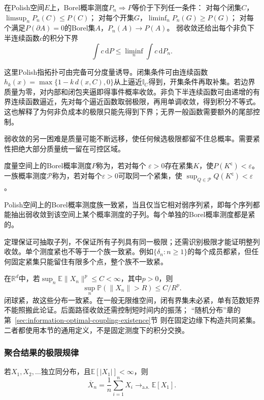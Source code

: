 \begin{theorem}[Portmanteau的常用形式]
\label{thm:rv-portmanteau}
在Polish空间\(E\)上，Borel概率测度\(P_n\Rightarrow P\)等价于下列任一条件：
对每个闭集\(C\)，\(\limsup_nP_n(C)\leq P(C)\)；
对每个开集\(G\)，\(\liminf_nP_n(G)\geq P(G)\)；
对每个满足\(P(\partial A)=0\)的Borel集\(A\)，\(P_n(A)\to P(A)\)。
弱收敛还给出每个非负下半连续函数\(c\)的积分下界
\[
\int c\,\mathrm dP\leq\liminf_n\int c\,\mathrm dP_n.
\]
\end{theorem}
这里Polish指拓扑可由完备可分度量诱导。闭集条件可由连续函数
\(h_k(x)=\max\{1-k\,d(x,C),0\}\)从上逼近\(\mathbb I_C\)得到，开集条件再取补集。若边界质量为零，对内部和闭包夹逼即得事件概率收敛。非负下半连续函数可由递增的有界连续函数逼近，先对每个逼近函数取弱极限，再用单调收敛，得到积分不等式。这也解释了为何非负成本的极限只能先得到下界；无界一般函数需要额外的尾部控制。

弱收敛的另一困难是质量可能不断远移，使任何候选极限都留不住总概率。需要紧性把绝大部分质量统一留在可控区域。
\begin{definition}[紧概率测度与一致紧族]
\label{def:information-tightness}
度量空间上的Borel概率测度\(P\)称为，若对每个
\(\varepsilon>0\)存在紧集\(K\)，使\(P(K^{\mathsf c})<\varepsilon\)。
一族概率测度\(\mathcal P\)称为，若对每个\(\varepsilon>0\)可取同一个紧集，使
\(\sup_{Q\in\mathcal P}Q(K^{\mathsf c})<\varepsilon\)。
\end{definition}
\begin{theorem}[Prokhorov定理]
\label{thm:rv-prokhorov}
Polish空间上的Borel概率测度族一致紧，当且仅当它相对弱序列紧，即每个序列都能抽出弱收敛到该空间上某个概率测度的子列。每个单独的Borel概率测度都是紧的。
\end{theorem}
定理保证可抽取子列，不保证所有子列具有同一极限；还需识别极限才能证明整列收敛。单个测度紧也不等于一个族一致紧。例如\(\{\delta_n:n\geq1\}\)的每个成员都紧，但任何固定紧集只能留住有限多个点，整个族不一致紧。

在\(\mathbb R^d\)中，若\(\sup_n\mathbb E\|X_n\|^p\leq C<\infty\)，其中\(p>0\)，则
\[
\sup_n\mathbb P(\|X_n\|>R)\leq C/R^p.
\]
闭球紧，故这些分布一致紧。在一般无限维空间，闭有界集未必紧，单有范数矩界不能照搬此论证。后面路径收敛还需控制短时间内的振荡；
“随机分布”章的第~\ref{sec:information-optimal-coupling-existence}节
则在固定边缘下构造共同紧集。二者都使用本节的通用定义，不是固定测度下的积分交换。

\subsubsection{聚合结果的极限规律}
\label{sec:rv-aggregate-limits}
\begin{theorem}[强大数定律]
\label{thm:probability-strong-law-large-numbers}
若\(X_1,X_2,\ldots\)独立同分布，且\(\mathbb{E}[|X_1|]<\infty\)，则
\[ \overline{X}_n
  =\frac{1}{n}\sum_{i=1}^{n}X_i\to_{\mathrm{a.s.}}\mathbb{E}[X_1]. \]
\end{theorem}

